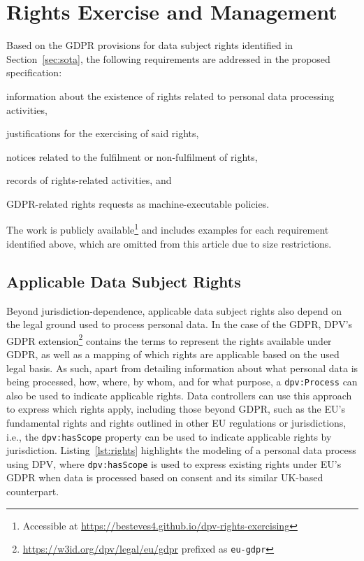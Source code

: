 \documentclass{IOS-Book-Article}     %
\begin{document}
\section{Rights Exercise and Management}
\label{sec:rights}

Based on the GDPR provisions for data subject rights identified in Section~\ref{sec:sota}, the following requirements are addressed in the proposed specification:
\begin{inlineabc}
    \item[(\textit{Section~\ref{sec:applicable-rights}})] information about the existence of rights related to personal data processing activities,
    \item[(\textit{Section~\ref{sec:justifications}})] justifications for the exercising of said rights,
    \item[(\textit{Section~\ref{sec:notices}})] notices related to the fulfilment or non-fulfilment of rights,
    \item[(\textit{Section~\ref{sec:records}})] records of rights-related activities, and
    \item[(\textit{Section~\ref{sec:policies}})] GDPR-related rights requests as machine-executable policies.
\end{inlineabc}
The work is publicly available\footnote{Accessible at  \url{https://besteves4.github.io/dpv-rights-exercising}} and includes examples for each requirement identified above, which are omitted from this article due to size restrictions.

\subsection{Applicable Data Subject Rights}
\label{sec:applicable-rights}

Beyond jurisdiction-dependence, applicable data subject rights also depend on the legal ground used to process personal data.
In the case of the GDPR, DPV's GDPR extension\footnote{\url{https://w3id.org/dpv/legal/eu/gdpr} prefixed as \texttt{eu-gdpr}} contains the terms to represent the rights available under GDPR, as well as a mapping of which rights are applicable based on the used legal basis.
As such, apart from detailing information about what personal data is being processed, how, where, by whom, and for what purpose, a \texttt{dpv:Process} can also be used to indicate applicable rights.
Data controllers can use this approach to express which rights apply, including those beyond GDPR, such as the EU’s fundamental rights and rights outlined in other EU regulations or jurisdictions, i.e., the \texttt{dpv:hasScope} property can be used to indicate applicable rights by jurisdiction.
Listing~\ref{lst:rights} highlights the modeling of a personal data process using DPV, where \texttt{dpv:hasScope} is used to express existing rights under EU's GDPR when data is processed based on consent and its similar UK-based counterpart.
\end{document}
